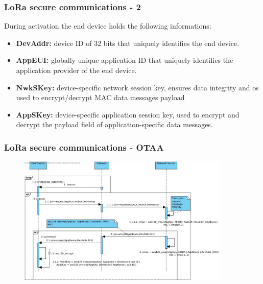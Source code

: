 \begin{frame}[fragile]
  \frametitle{LoRa secure communications - 2}
  During activation the end device holds the following informations:
  \begin{itemize}
      \item \textbf{DevAddr:} device ID of 32 bits that uniquely identifies the end device.
      \item \textbf{AppEUI:} globally unique application ID that uniquely identifies the application provider of the end device.
      \item \textbf{NwkSKey:} device-specific network session key, ensures data integrity and os used to encrypt/decrypt MAC data messages payload
      \item \textbf{AppSKey:} device-specific application session key, used to encrypt and decrypt the payload field of application-specific data messages.
  \end{itemize}
\end{frame}


\begin{frame}[fragile]
  \frametitle{LoRa secure communications - OTAA}
 \begin{figure}
  \centering
  \includegraphics[width=0.9\textwidth]{img/lora_secure.png}
  \end{figure}
\end{frame}

